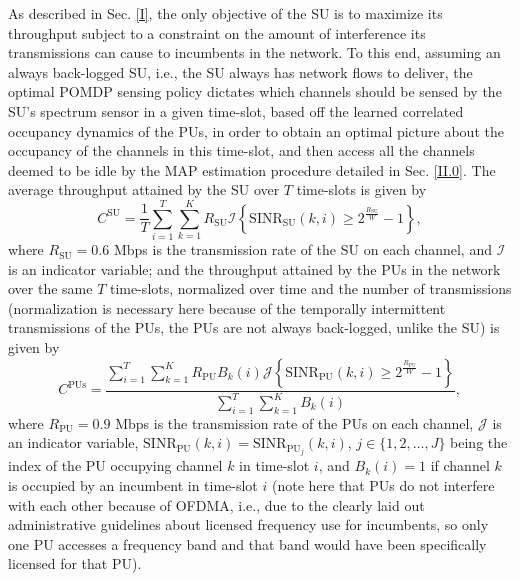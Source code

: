 \documentclass[12pt, draftcls, onecolumn]{IEEEtran}
\begin{document}
As described in Sec. \ref{I}, the only objective of the SU is to maximize its throughput subject to a constraint on the amount of interference its transmissions can cause to incumbents in the network. To this end, assuming an always back-logged SU, i.e., the SU always has network flows to deliver, the optimal POMDP sensing policy dictates which channels should be sensed by the SU's spectrum sensor in a given time-slot, based off the learned correlated occupancy dynamics of the PUs, in order to obtain an optimal picture about the occupancy of the channels in this time-slot, and then access all the channels deemed to be idle by the MAP estimation procedure detailed in Sec. \ref{II.0}. The average throughput attained by the SU over $T$ time-slots is given by
\begin{equation}\label{30}
    C^{\text{SU}}=\frac{1}{T}\sum_{i=1}^{T}\sum_{k=1}^{K}R_{\text{SU}}\mathcal{I}\left\{\text{SINR}_{\text{SU}}(k,i) \geq 2^{\frac{R_{\text{SU}}}{W}}-1\right\},
\end{equation}
where $R_{\text{SU}}{=}0.6$ Mbps is the transmission rate of the SU on each channel, and $\mathcal{I}$ is an indicator variable; and the throughput attained by the PUs in the network over the same $T$ time-slots, normalized over time and the number of transmissions (normalization is necessary here because of the temporally intermittent transmissions of the PUs, the PUs are not always back-logged, unlike the SU) is given by
\begin{equation}\label{31}
    C^{\text{PUs}}=\frac{\sum_{i=1}^{T}\sum_{k=1}^{K}R_{\text{PU}}B_{k}(i)\mathcal{J}\left\{\text{SINR}_{\text{PU}}(k,i) \geq 2^{\frac{R_{\text{PU}}}{W}}-1\right\}}{\sum_{i=1}^{T}\sum_{k=1}^{K}B_{k}(i)},
\end{equation}
where $R_{\text{PU}}{=}0.9$ Mbps is the transmission rate of the PUs on each channel, $\mathcal{J}$ is an indicator variable, $\text{SINR}_{\text{PU}}(k,i){=}\text{SINR}_{\text{PU}_{j}}(k,i)$, $j{\in}\{1,2,\dots,J\}$ being the index of the PU occupying channel $k$ in time-slot $i$, and $B_{k}(i){=}1$ if channel $k$ is occupied by an incumbent in time-slot $i$ (note here that PUs do not interfere with each other because of OFDMA, i.e., due to the clearly laid out administrative guidelines about licensed frequency use for incumbents, so only one PU accesses a frequency band and that band would have been specifically licensed for that PU).
\end{document}
